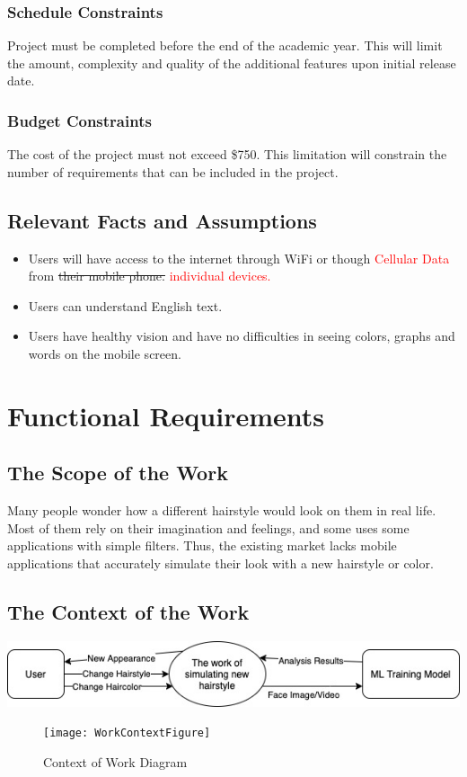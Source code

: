 \documentclass[12pt]{article}
\begin{document}
\subsubsection{Schedule Constraints}
Project must be completed before the end of the academic year. This will limit the amount, complexity and quality of the additional features upon initial release date.
\subsubsection{Budget Constraints}
The cost of the project must not exceed \$750. This limitation will constrain the number of requirements that can be included in the project.
  
\subsection{Relevant Facts and Assumptions}
\begin{itemize}
    \item Users will have access to the internet through WiFi or though \textcolor{red}{ Cellular Data} from \sout{their mobile phone.}\textcolor{red}{ individual devices.}
    \item Users can understand English text.
    \item Users have healthy vision and have no difficulties in seeing colors, graphs and words on the mobile screen.
\end{itemize}

\section{Functional Requirements}
\subsection{The Scope of the Work}
Many people wonder how a different hairstyle would look on them in real life. Most of them rely on their imagination and feelings, and some uses some applications with simple filters. Thus, the existing market lacks mobile applications that accurately simulate their look with a new hairstyle or color.

\subsection{The Context of the Work}
\graphicspath{ {./context_work_diagram.jpg/} }
\includegraphics[width=\textwidth]{context_work_diagram}
\begin{figure}[h!]
\begin{center}
 \texttt{[image: WorkContextFigure]}
\caption{Context of Work Diagram}
\label{Fig_SystemContext} 
\end{center}
\end{figure}
\end{document}
